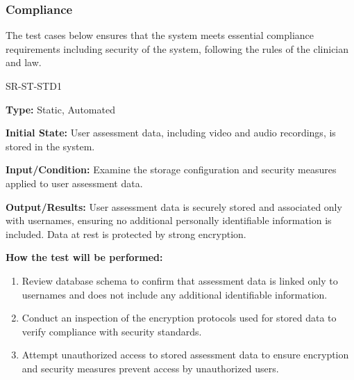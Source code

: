 \documentclass[12pt, titlepage]{article}
\begin{document}
\subsubsection{Compliance}

The test cases below ensures that the system meets essential 
compliance requirements including security of the system, following the rules of the clinician and law.
		
\begin{itemize}
  \begin{item}
    SR-ST-STD1
    \begin{mdframed}[linewidth=0.5mm]
      \textbf{Type:} Static, Automated \par
      \textbf{Initial State:} User assessment data, including video and audio recordings, is stored in the system. \par
      \textbf{Input/Condition:} Examine the storage configuration and security measures applied to user assessment data. \par
      \textbf{Output/Results:} User assessment data is securely stored and associated only with usernames, 
      ensuring no additional personally identifiable information is included. Data at rest is protected by strong encryption. \par
      \textbf{How the test will be performed:}
      \begin{enumerate}[noitemsep]
        \item Review database schema to confirm that assessment data is linked only to usernames and does not
         include any additional identifiable information.
        \item Conduct an inspection of the encryption protocols used for stored data to verify compliance with
         security standards.
        \item Attempt unauthorized access to stored assessment data to ensure encryption and security measures
         prevent access by unauthorized users.
      \end{enumerate}
    \end{mdframed}
  \end{item}

\end{itemize}
\end{document}
